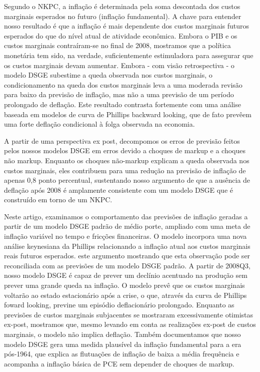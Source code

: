 Segundo o NKPC, a inflação é determinada pela soma descontada dos custos marginais esperados no futuro (inflação fundamental). A chave para entender nosso resultado é que a inflação é mais dependente dos custos marginais futuros esperados do que do nível atual de atividade econômica. Embora o PIB e os custos marginais contraíram-se no final de 2008, mostramos que a política monetária tem sido, na verdade, suficientemente estimuladora para assegurar que os custos marginais devam aumentar. Embora - com visão retrospectiva - o modelo DSGE subestime a queda observada nos custos marginais, o condicionamento na queda dos custos marginais leva a uma moderada revisão para baixo da previsão de inflação, mas não a uma previsão de um período prolongado de deflação. Este resultado contrasta fortemente com uma análise baseada em modelos de curva de Phillips backward looking, que de fato prevêem uma forte deflação condicional à folga observada na economia.

A partir de uma perspectiva ex post, decompomos os erros de previsão feitos pelos nossos modelos DSGE em erros devido a choques de markup e a choques não markup. Enquanto os choques não-markup explicam a queda observada nos custos marginais, eles contribuem para uma redução na previsão de inflação de apenas 0,8 ponto percentual, sustentando nosso argumento de que a ausência de deflação após 2008 é amplamente
consistente com um modelo DSGE que é construído em torno de um NKPC.

Neste artigo, examinamos o comportamento das previsões de inflação geradas a partir de um modelo DSGE padrão de médio porte, ampliado com uma meta de inflação variável no tempo e fricções financeiras. O modelo incorpora uma nova análise keynesiana da Phillips relacionando a inflação atual aos custos marginais reais futuros esperados. este argumento mostrando que esta observação pode ser reconciliada com as previsões de um modelo DSGE padrão. A partir de 2008Q3, nosso modelo DSGE é capaz de prever um declínio acentuado na produção sem prever uma grande queda na inflação. O modelo prevê que os custos marginais voltarão ao estado estacionário após a crise, o que, através da curva de Phillips foward looking, previne um episódio deflacionário prolongado. Enquanto as previsões de custos marginais subjacentes se mostraram excessivamente otimistas ex-post, mostramos que, mesmo levando em conta as realizações ex-post de custos marginais, o modelo não implica deflação. Também documentamos que nosso modelo DSGE gera uma medida plausível da inflação fundamental para a era pós-1964, que explica as flutuações de inflação de baixa a média frequência e acompanha a inflação básica de PCE sem depender de choques de markup.
%
%
